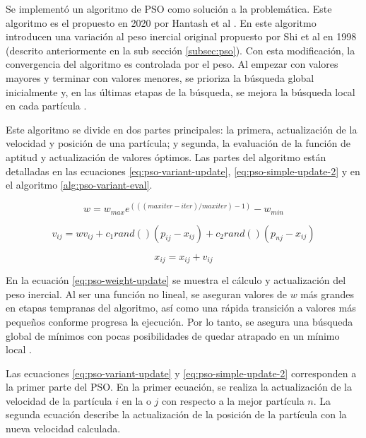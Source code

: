 \documentclass[letterpaper]{report}
\begin{document}
    Se implementó un algoritmo de PSO como solución a la problemática. Este
    algoritmo es el propuesto
    en 2020 por Hantash et al \cite{PSOEnergy}. En este algoritmo introducen una
    variación al peso inercial original propuesto por Shi et al \cite{CPSO} en
    1998 (descrito anteriormente en la sub sección \ref{subsec:pso}). Con esta
    modificación, la convergencia del algoritmo es controlada por el peso. Al 
    empezar con valores mayores y terminar con valores menores, se prioriza la
    búsqueda global inicialmente y, en las últimas etapas de la búsqueda, se
    mejora la búsqueda local en cada partícula \cite{CPSO}.

    Este algoritmo se divide en dos
    partes principales: la primera, actualización de la velocidad y posición de
    una partícula; y segunda, la evaluación de la función de aptitud y
    actualización de valores óptimos. Las partes del algoritmo están detalladas
    en las ecuaciones \ref{eq:pso-variant-update}, \ref{eq:pso-simple-update-2}
    y en el algoritmo \ref{alg:pso-variant-eval}.

    \begin{equation}
      \label{eq:pso-weight-update}
      w = w_{max} e^{(((maxiter - iter) / maxiter) - 1)} - w_{min} 
    \end{equation}

    \begin{equation}
      v_{ij} = w v_{ij} + c_1 rand()(p_{ij} - x_{ij}) + c_2 rand()(p_{nj}
        - x_{ij})
      \label{eq:pso-variant-update}
    \end{equation}

    \begin{equation}
      x_{ij} = x_{ij} + v_{ij}
      \label{eq:pso-simple-update-2}
    \end{equation}

    En la ecuación \ref{eq:pso-weight-update} se muestra el cálculo y
    actualización del peso inercial. Al ser una función no lineal, se aseguran
    valores de $w$ más grandes en etapas tempranas del algoritmo, así como una
    rápida transición a valores más pequeños conforme progresa la ejecución. Por
    lo tanto, se asegura una búsqueda global de mínimos con pocas posibilidades
    de quedar atrapado en un mínimo local \cite{APSO2016}. 

    Las ecuaciones \ref{eq:pso-variant-update} y \ref{eq:pso-simple-update-2}
    corresponden a la primer parte del PSO. En la primer ecuación, se realiza la
    actualización de la velocidad de la partícula $i$ en la o $j$ con
    respecto a la mejor partícula $n$. La segunda ecuación describe la
    actualización de la posición de la partícula con la nueva velocidad
    calculada.
\end{document}
